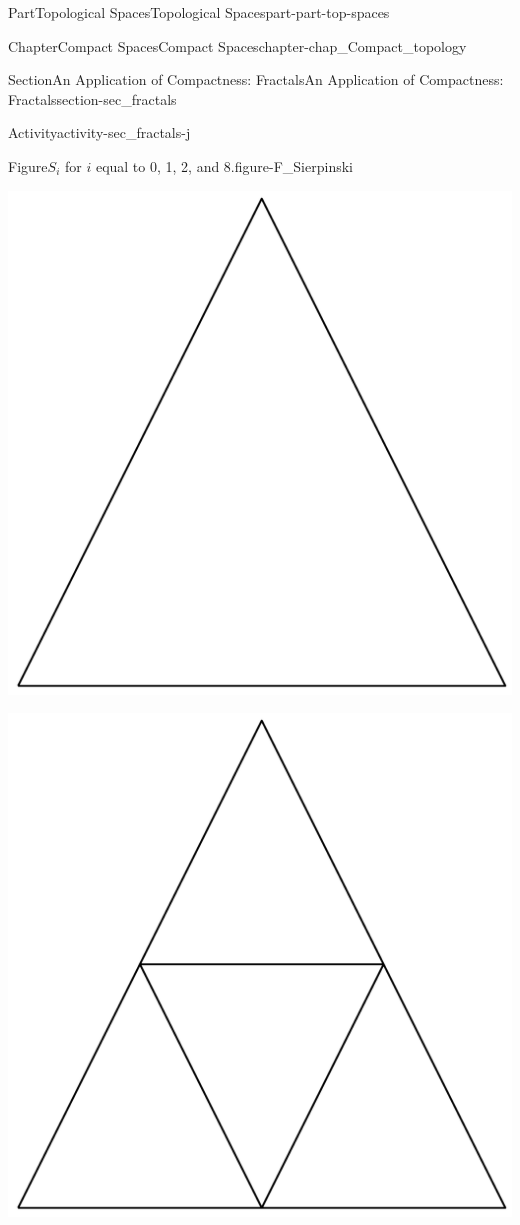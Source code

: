 \documentclass[oneside,10pt,]{book}
\numberwithin{equation}{chapter}
\begin{document}
\begin{partptx}{Part}{Topological Spaces}{}{Topological Spaces}{}{}{part-part-top-spaces}
\begin{chapterptx}{Chapter}{Compact Spaces}{}{Compact Spaces}{}{}{chapter-chap_Compact_topology}
\begin{sectionptx}{Section}{An Application of Compactness: Fractals}{}{An Application of Compactness: Fractals}{}{}{section-sec_fractals}
\begin{activity}{Activity}{}{activity-sec_fractals-j}
\begin{enumerate}[font=\bfseries,label=(\alph*),ref=\alph*]
\begin{figureptx}{Figure}{\(S_i\) for \(i\) equal to 0, 1, 2, and 8.}{figure-F_Sierpinski}{}
\begin{sidebyside}{2}{0}{0}{0}
\begin{sbspanel}{0.5}
\includegraphics[width=\linewidth]{external/S0.pdf}
\end{sbspanel}%
\begin{sbspanel}{0.5}%
\includegraphics[width=\linewidth]{external/S1.pdf}

\end{sbspanel}
\end{sidebyside}
\end{figureptx}
\end{enumerate}
\end{activity}
\end{sectionptx}
\end{chapterptx}
\end{partptx}
\end{document}
